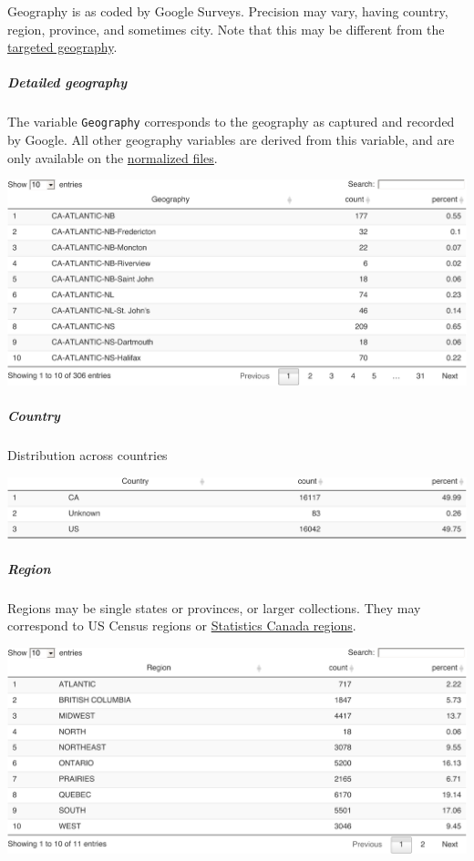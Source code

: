 \documentclass[
]{article}
\begin{document}
Geography is as coded by Google Surveys. Precision may vary, having
country, region, province, and sometimes city. Note that this may be
different from the \protect\hyperlink{geographic-target}{targeted
geography}.

\hypertarget{detailed-geography}{%
\subparagraph{Detailed geography}\label{detailed-geography}}

The variable \texttt{Geography} corresponds to the geography as captured
and recorded by Google. All other geography variables are derived from
this variable, and are only available on the
\protect\hyperlink{normalized-files}{normalized files}.

\includegraphics{expectations-codebook_files/figure-latex/details_geography-1.pdf}

\hypertarget{country}{%
\subparagraph{Country}\label{country}}

Distribution across countries

\includegraphics{expectations-codebook_files/figure-latex/details_country-1.pdf}

\hypertarget{region}{%
\subparagraph{Region}\label{region}}

Regions may be single states or provinces, or larger collections. They
may correspond to US Census regions or
\href{https://www12.statcan.gc.ca/census-recensement/2011/ref/dict/table-tableau/table-tableau-8-eng.cfm}{Statistics
Canada regions}.

\includegraphics{expectations-codebook_files/figure-latex/details_regions-1.pdf}
\end{document}
